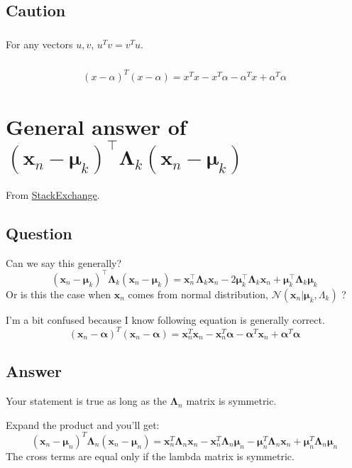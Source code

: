 \documentclass[a4paper,10.5pt]{jsarticle}  %
\begin{document}
\subsection{Caution}
\subsubsection{}
For any vectors $u, v$, $u^Tv = v^Tu$.

\subsubsection{}
\begin{align*}
  (x-\alpha)^T (x-\alpha) = x^T x - x^T \alpha - \alpha^T x + \alpha^T \alpha 
\end{align*}

\section{General answer of $(\mathbf{x}_n - \boldsymbol{\mu}_k)^\top \boldsymbol{\Lambda}_k(\mathbf{x}_n - \boldsymbol{\mu}_k)$}
From \href{http://math.stackexchange.com/questions/1913182/general-answer-of-mathbfx-n-boldsymbol-mu-k-top-boldsymbol-lambda/1913208#1913208}{StackExchange}.
\subsection{Question}
Can we say this generally? 
$$(\mathbf{x}_n - \boldsymbol{\mu}_k)^\top \boldsymbol{\Lambda}_k(\mathbf{x}_n - \boldsymbol{\mu}_k) = \mathbf{x}_n^\top \boldsymbol{\Lambda}_k \mathbf{x}_n - 2 \boldsymbol{\mu}_k^\top \boldsymbol{\Lambda}_k \mathbf{x}_n + \boldsymbol{\mu}_k^\top \boldsymbol{\Lambda}_k \boldsymbol{\mu}_k$$
Or is this the case when $\mathbf{x}_n$ comes from normal distribution, $\mathcal{N}(\mathbf{x}_n|\boldsymbol{\mu}_k,{\Lambda}_k)$ ?

I'm a bit confused because I know following equation is generally correct.
$$(\mathbf{x}_n - \boldsymbol{\alpha})^T (\mathbf{x}_n-\boldsymbol{\alpha}) = \mathbf{x}_n^T \mathbf{x}_n - \mathbf{x}_n^T \boldsymbol{\alpha} - \boldsymbol{\alpha}^T \mathbf{x}_n + \boldsymbol{\alpha}^T \boldsymbol{\alpha} $$

\subsection{Answer}
Your statement is true as long as the $\mathbf{\Lambda}_n$ matrix is symmetric. 

Expand the product and you'll get:
$$(\mathbf{x}_n -  \mathbf{\mu}_n)^T \mathbf{\Lambda}_n (\mathbf{x}_n -  \mathbf{\mu}_n) = \mathbf{x}_n ^T \mathbf{\Lambda}_n \mathbf{x}_n - \mathbf{x}_n^T \mathbf{\Lambda}_n \mathbf{\mu}_n -  \mathbf{\mu}_n^T \mathbf{\Lambda}_n \mathbf{x}_n + \mathbf{\mu}_n^T \mathbf{\Lambda}_n \mathbf{\mu}_n$$
The cross terms are equal only if the lambda matrix is symmetric. 
\end{document}
